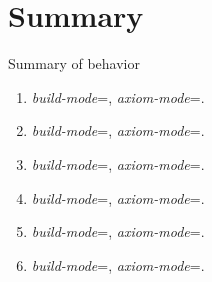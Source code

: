 \section{Summary}

\begin{frame}[t]{Summary of behavior}
\begin{enumerate}
\item \emph{build-mode}=, \emph{axiom-mode}=.
\item \emph{build-mode}=, \emph{axiom-mode}=.
\item \emph{build-mode}=, \emph{axiom-mode}=.
\item \emph{build-mode}=, \emph{axiom-mode}=.
\item \emph{build-mode}=, \emph{axiom-mode}=.
\item \emph{build-mode}=, \emph{axiom-mode}=.
\end{enumerate}
\end{frame}
